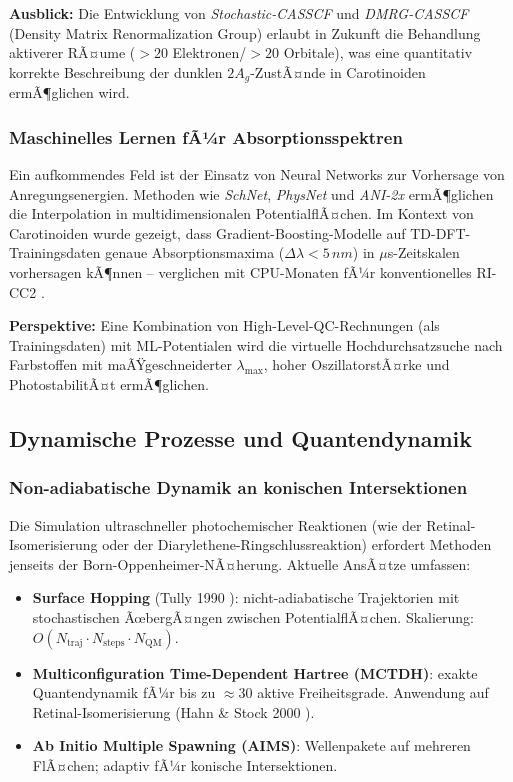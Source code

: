 ﻿\documentclass[a4paper,12pt]{article}
\theoremstyle{definition}
\begin{document}
\textbf{Ausblick:} Die Entwicklung von \emph{Stochastic-CASSCF} und
\emph{DMRG-CASSCF} (Density Matrix Renormalization Group) erlaubt in Zukunft
die Behandlung aktiverer RÃ¤ume ($> 20$ Elektronen/$> 20$ Orbitale),
was eine quantitativ korrekte Beschreibung der dunklen $2A_g$-ZustÃ¤nde in
Carotinoiden ermÃ¶glichen wird.

\subsubsection{Maschinelles Lernen fÃ¼r Absorptionsspektren}

Ein aufkommendes Feld ist der Einsatz von Neural Networks zur Vorhersage von
Anregungsenergien. Methoden wie \emph{SchNet}, \emph{PhysNet} und
\emph{ANI-2x} ermÃ¶glichen die Interpolation in multidimensionalen
PotentialflÃ¤chen. Im Kontext von Carotinoiden wurde gezeigt, dass
Gradient-Boosting-Modelle auf TD-DFT-Trainingsdaten genaue
Absorptionsmaxima ($\Delta\lambda < 5\,\si{nm}$) in $\mu$s-Zeitskalen
vorhersagen kÃ¶nnen -- verglichen mit CPU-Monaten fÃ¼r konventionelles RI-CC2
\cite{zurek2021}.

\textbf{Perspektive:} Eine Kombination von High-Level-QC-Rechnungen
(als Trainingsdaten) mit ML-Potentialen wird die virtuelle
Hochdurchsatzsuche nach Farbstoffen mit maÃŸgeschneiderter $\lambda_{\max}$,
hoher OszillatorstÃ¤rke und PhotostabilitÃ¤t ermÃ¶glichen.

\subsection{Dynamische Prozesse und Quantendynamik}

\subsubsection{Non-adiabatische Dynamik an konischen Intersektionen}

Die Simulation ultraschneller photochemischer Reaktionen (wie der Retinal-Isomerisierung
oder der Diarylethene-Ringschlussreaktion) erfordert Methoden jenseits der
Born-Oppenheimer-NÃ¤herung. Aktuelle AnsÃ¤tze umfassen:
\begin{itemize}
  \item \textbf{Surface Hopping} (Tully 1990 \cite{tully1990}): nicht-adiabatische
        Trajektorien mit stochastischen ÃœbergÃ¤ngen zwischen PotentialflÃ¤chen.
        Skalierung: $O(N_\mathrm{traj} \cdot N_\mathrm{steps} \cdot N_\mathrm{QM})$.
  \item \textbf{Multiconfiguration Time-Dependent Hartree (MCTDH)}:
        exakte Quantendynamik fÃ¼r bis zu $\approx 30$ aktive Freiheitsgrade.
        Anwendung auf Retinal-Isomerisierung (Hahn \& Stock 2000 \cite{hahn2000}).
  \item \textbf{Ab Initio Multiple Spawning (AIMS)}: Wellenpakete auf mehreren
        FlÃ¤chen; adaptiv fÃ¼r konische Intersektionen.
\end{itemize}
\end{document}
